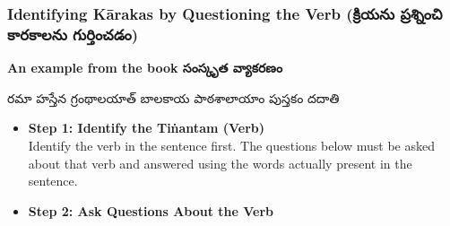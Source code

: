 \documentclass[12pt,a4paper]{article}
\newcommand{\te}[1]{{\telugufont #1}}
\renewcommand{\arraystretch}{1.25}
\begin{document}
\newpage

\subsubsection{Identifying Kārakas by Questioning the Verb
(\te{క్రియను ప్రశ్నించి కారకాలను గుర్తించడం})}

\textbf{An example from the book \te{సంస్కృత వ్యాకరణం}}

\begin{mainbox}
\centering
\te{రమా హస్తేన గ్రంథాలయాత్ బాలకాయ పాఠశాలాయాం పుస్తకం దదాతి}
\end{mainbox}

\begin{itemize}
    \item \textbf{Step 1: Identify the Tiṅantam (Verb)}\\
    Identify the verb in the sentence first. The questions below
    must be asked about that verb and answered using the words
    actually present in the sentence.

    \item \textbf{Step 2: Ask Questions About the Verb}
            \begin{center}
            \small
            \renewcommand{\arraystretch}{1.5}
            

\end{center}
\end{itemize}
\end{document}
